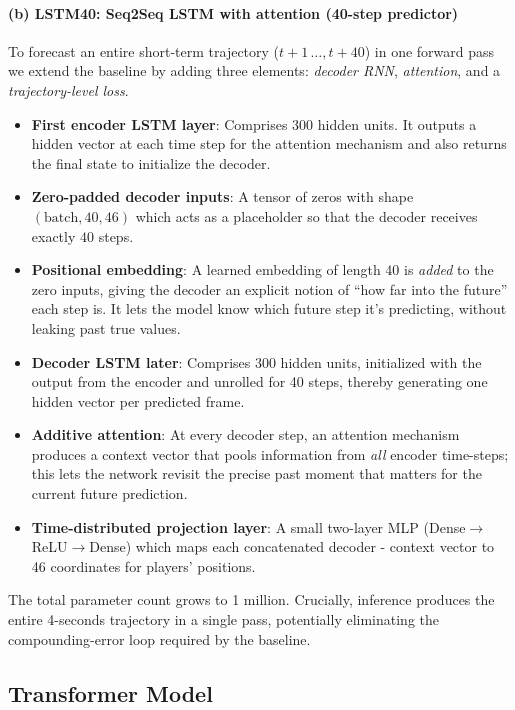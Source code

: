\documentclass[sigconf]{acmart}
\begin{document}
\paragraph{(b) LSTM40: Seq2Seq LSTM with attention (40-step predictor)}
To forecast an entire short-term trajectory (\(t+1\,\dots,t+40\)) in one forward pass we extend the baseline by adding three elements: \textit{decoder RNN}, \textit{attention}, and a \textit{trajectory-level loss}.

\begin{itemize}
    \item \textbf{First encoder LSTM layer}: Comprises 300 hidden units. It outputs a hidden vector at each time step for the attention mechanism and also returns the final state to initialize the decoder.
    \item \textbf{Zero-padded decoder inputs}: A tensor of zeros with shape \((\text{batch},40,46)\) which acts as a placeholder so that the decoder receives exactly \(40\) steps.
    \item \textbf{Positional embedding}: A learned embedding of length \(40\) is \textit{added} to the zero inputs, giving the decoder an explicit notion of “how far into the future” each step is. It lets the model know which future step it’s predicting, without leaking past true values.
    \item \textbf{Decoder LSTM later}: Comprises 300 hidden units, initialized with the output from the encoder and unrolled for 40 steps, thereby generating one hidden vector per predicted frame.
    \item \textbf{Additive attention}: At every decoder step, an attention mechanism produces a context vector that pools information from \emph{all} encoder time-steps; this lets the network revisit the precise past moment that matters for the current future prediction.
    \item \textbf{Time-distributed projection layer}: A small two-layer MLP (Dense\(\rightarrow\)ReLU\(\rightarrow\)Dense) which maps each concatenated decoder - context vector to 46 coordinates for players' positions.

\end{itemize}

The total parameter count grows to 1 million.  Crucially, inference produces the entire 4-seconds trajectory in a single pass, potentially eliminating the compounding-error loop required by the baseline.


\subsection{Transformer Model}
\end{document}
